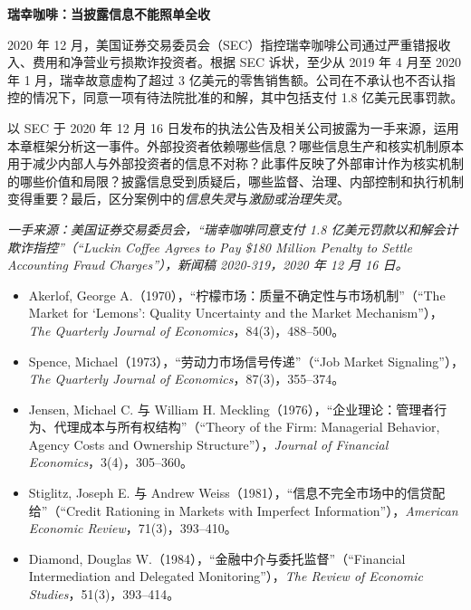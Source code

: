 

\textbf{瑞幸咖啡：当披露信息不能照单全收}

2020 年 12 月，美国证券交易委员会（SEC）指控瑞幸咖啡公司通过严重错报收入、费用和净营业亏损欺诈投资者。根据 SEC 诉状，至少从 2019 年 4 月至 2020 年 1 月，瑞幸故意虚构了超过 3 亿美元的零售销售额。公司在不承认也不否认指控的情况下，同意一项有待法院批准的和解，其中包括支付 1.8 亿美元民事罚款。

以 SEC 于 2020 年 12 月 16 日发布的执法公告及相关公司披露为一手来源，运用本章框架分析这一事件。外部投资者依赖哪些信息？哪些信息生产和核实机制原本用于减少内部人与外部投资者的信息不对称？此事件反映了外部审计作为核实机制的哪些价值和局限？披露信息受到质疑后，哪些监督、治理、内部控制和执行机制变得重要？最后，区分案例中的\emph{信息失灵}与\emph{激励或治理失灵}。

\emph{一手来源：美国证券交易委员会，“瑞幸咖啡同意支付 1.8 亿美元罚款以和解会计欺诈指控”（``Luckin Coffee Agrees to Pay \$180 Million Penalty to Settle Accounting Fraud Charges''），新闻稿 2020-319，2020 年 12 月 16 日。}


\begin{itemize}

\item Akerlof, George A.（1970），“柠檬市场：质量不确定性与市场机制”（``The Market for `Lemons': Quality Uncertainty and the Market Mechanism''），\emph{The Quarterly Journal of Economics}，84(3)，488--500。

\item Spence, Michael（1973），“劳动力市场信号传递”（``Job Market Signaling''），\emph{The Quarterly Journal of Economics}，87(3)，355--374。

\item Jensen, Michael C. 与 William H. Meckling（1976），“企业理论：管理者行为、代理成本与所有权结构”（``Theory of the Firm: Managerial Behavior, Agency Costs and Ownership Structure''），\emph{Journal of Financial Economics}，3(4)，305--360。

\item Stiglitz, Joseph E. 与 Andrew Weiss（1981），“信息不完全市场中的信贷配给”（``Credit Rationing in Markets with Imperfect Information''），\emph{American Economic Review}，71(3)，393--410。

\item Diamond, Douglas W.（1984），“金融中介与委托监督”（``Financial Intermediation and Delegated Monitoring''），\emph{The Review of Economic Studies}，51(3)，393--414。

\end{itemize}
